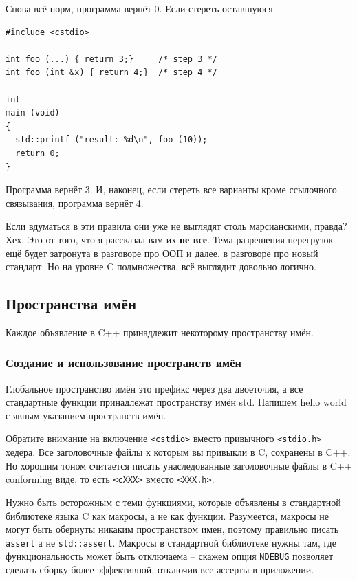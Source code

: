 \documentclass[a4paper,12pt,oneside]{article}
\begin{document}
Снова всё норм, программа вернёт 0. Если стереть оставшуюся.

\begin{lstlisting}
#include <cstdio>

int foo (...) { return 3;}     /* step 3 */
int foo (int &x) { return 4;}  /* step 4 */

int
main (void)
{
  std::printf ("result: %d\n", foo (10));
  return 0;
}
\end{lstlisting}

Программа вернёт 3. И, наконец, если стереть все варианты кроме ссылочного связывания, программа вернёт 4.

Если вдуматься в эти правила они уже не выглядят столь марсианскими, правда? Хех. Это от того, что я рассказал вам их \textbf{не все}. Тема разрешения перегрузок ещё будет затронута в разговоре про ООП и далее, в разговоре про новый стандарт. Но на уровне C подмножества, всё выглядит довольно логично.

\pagebreak
\subsection{Пространства имён}\label{Namespaces}

Каждое объявление в C++ принадлежит некоторому пространству имён. 

\subsubsection{Создание и использование пространств имён}

Глобальное пространство имён это префикс через два двоеточия, а все стандартные функции принадлежат пространству имён std. Напишем hello world с явным указанием пространств имён.



Обратите внимание на включение \lstinline!<cstdio>! вместо привычного \lstinline!<stdio.h>! хедера. Все заголовочные файлы к которым вы привыкли в C, сохранены в C++. Но хорошим тоном считается писать унаследованные заголовочные файлы в C++ conforming виде, то есть \lstinline!<cXXX>! вместо \lstinline!<XXX.h>!.

Нужно быть осторожным с теми функциями, которые объявлены в стандартной библиотеке языка C как макросы, а не как функции. Разумеется, макросы не могут быть обернуты никаким пространством имен, поэтому правильно писать \lstinline!assert! а не \lstinline!std::assert!. Макросы в стандартной библиотеке нужны там, где функциональность может быть отключаема -- скажем опция \lstinline!NDEBUG! позволяет сделать сборку более эффективной, отключив все ассерты в приложении. 
\end{document}
